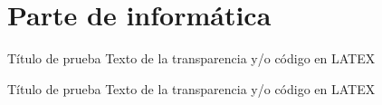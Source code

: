 \section{Parte de informática}

\begin{frame}{Título de prueba}
	Texto de la transparencia y/o código en LATEX
\end{frame}

\begin{frame}{Título de prueba}
	Texto de la transparencia y/o código en LATEX
\end{frame}
